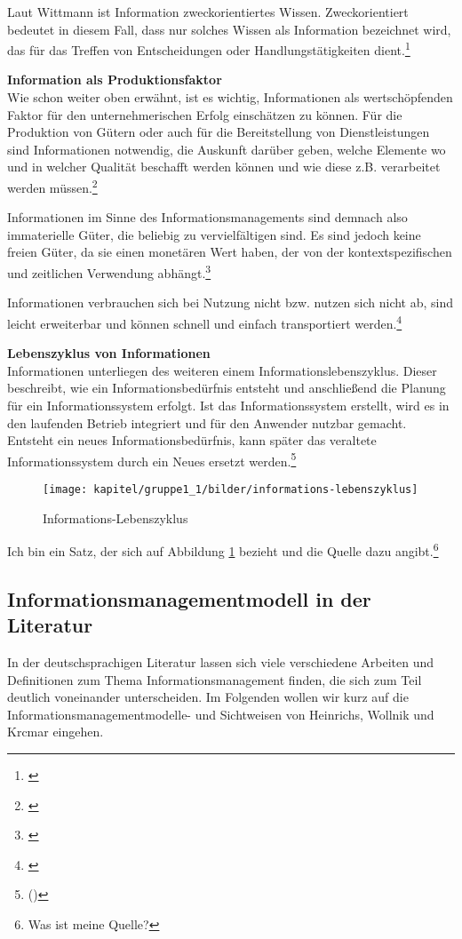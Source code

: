 Laut Wittmann ist Information zweckorientiertes Wissen. Zweckorientiert bedeutet in diesem Fall, dass nur solches Wissen als Information bezeichnet wird, das für das Treffen von Entscheidungen oder Handlungstätigkeiten dient.\footnote{\cite{wittmann_unternehmung_1959}}

\textbf{Information als Produktionsfaktor}\\
Wie schon weiter oben erwähnt, ist es wichtig, Informationen als wertschöpfenden Faktor für den unternehmerischen Erfolg einschätzen zu können. Für die Produktion von Gütern oder auch für die Bereitstellung von Dienstleistungen sind Informationen notwendig, die Auskunft darüber geben, welche Elemente wo und in welcher Qualität beschafft werden können und wie diese z.B. verarbeitet werden müssen.\footnote{\cite{bode_informationsbegriff_1997}}

Informationen im Sinne des Informationsmanagements sind demnach also immaterielle Güter, die beliebig zu vervielfältigen sind. Es sind jedoch keine freien Güter, da sie einen monetären Wert haben, der von der kontextspezifischen und zeitlichen Verwendung abhängt.\footnote{\cite{krcmar_informationsmanagement_2015}}

Informationen verbrauchen sich bei Nutzung nicht bzw. nutzen sich nicht ab, sind leicht erweiterbar und können schnell und einfach transportiert werden.\footnote{\cite{teubner_information_2005}}

\textbf{Lebenszyklus von Informationen}\\
Informationen unterliegen des weiteren einem Informationslebenszyklus. Dieser beschreibt, wie ein Informationsbedürfnis entsteht und anschließend die Planung für ein Informationssystem erfolgt. Ist das Informationssystem erstellt, wird es in den laufenden Betrieb integriert und für den Anwender nutzbar gemacht. Entsteht ein neues Informationsbedürfnis, kann später das veraltete Informationssystem durch ein Neues ersetzt werden.\footnote{(\cite{dippold_datenmanagement_2005})}

\begin{figure}[h!]
	\centering
	\texttt{[image: kapitel/gruppe1\_1/bilder/informations-lebenszyklus]}
	\caption{Informations-Lebenszyklus}
	\label{fig_informations_lebenszyklus}
\end{figure}

Ich bin ein Satz, der sich auf Abbildung \ref{fig_informations_lebenszyklus} bezieht und die Quelle dazu angibt.\footnote{Was ist meine Quelle?}

\subsection{Informationsmanagementmodell in der Literatur}
In der deutschsprachigen Literatur lassen sich viele verschiedene Arbeiten und Definitionen zum Thema Informationsmanagement finden, die sich zum Teil deutlich voneinander unterscheiden. Im Folgenden wollen wir kurz auf die Informationsmanagementmodelle- und Sichtweisen von Heinrichs, Wollnik und Krcmar eingehen.

